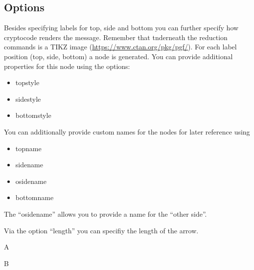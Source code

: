\documentclass[a4paper]{report}
\begin{document}
\subsection{Options}
Besides specifying labels for top, side and bottom you can further specify how cryptocode renders the message.
Remember that tnderneath the reduction commands is a TIKZ image (\url{https://www.ctan.org/pkg/pgf/}).
For each label position (top, side, bottom) a node is generated. You can provide additional properties for
this node using the options:
\begin{itemize}
\item topstyle
\item sidestyle
\item bottomstyle
\end{itemize}
You can additionally provide custom names for the nodes for later reference using
\begin{itemize}
\item topname
\item sidename
\item osidename
\item bottomname
\end{itemize}
The \enquote{osidename} allows you to provide a name for the \enquote{other side}. 

Via the option \enquote{length} you can specifiy the length of the arrow.


\begin{bbrenv}{A}
	\begin{bbrbox}[name=Box Name]

	\begin{bbrenv}{B}
		\begin{bbrbox}[name=Inner Box]
		\end{bbrbox}
		

	\end{bbrenv}

	\end{bbrbox}
\end{bbrenv}
\end{document}
